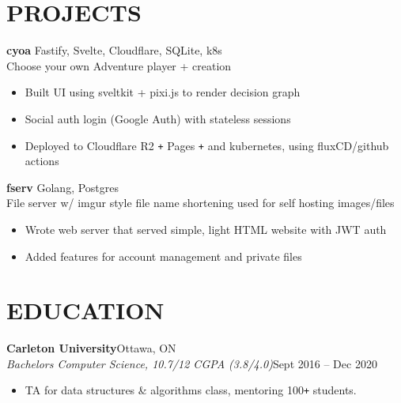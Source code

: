 \documentclass[letterpaper]{article}
\newcommand{\NewPart}[1]{\section*{\large\uppercase{\textbf{#1}}}}
\newcommand{\JobEntry}[3]{
	\normalsize\textbf{#1}\hfill\normalsize{#2}\\
	#3\vspace{0.1cm}
}
\newcommand{\DatedEntry}[3]{
	\small\textit{#1}\hfill\small{#2}\\
	\vspace{0.1cm}#3\vspace{0.1cm}
}
\newcommand{\ProjectEntry}[4]{\textbf{#1}
	\hfill \small{#2}\\
	#3\\\vspace{0.1cm}
	#4\vspace{0.1cm}
}
\begin{document}
\NewPart{Projects}
\ProjectEntry{cyoa}
{Fastify, Svelte, Cloudflare, SQLite, k8s}
{Choose your own Adventure player + creation}
{\begin{itemize}
	\item Built UI using sveltkit + pixi.js to render decision graph
	\item Social auth login (Google Auth) with stateless sessions
	\item Deployed to Cloudflare R2 \texttt{+} Pages \texttt{+} and kubernetes, using fluxCD/github actions
\end{itemize}}
\ProjectEntry{fserv}
{Golang, Postgres}
{File server w/ imgur style file name shortening used for self hosting images/files}
{\begin{itemize}
	\item Wrote web server that served simple, light HTML website with JWT auth
	\item Added features for account management and private files
\end{itemize}}\vspace{-0.3cm}

\NewPart{Education}
\JobEntry {Carleton University} {Ottawa, ON}
{\DatedEntry
{Bachelors Computer Science, 10.7/12 CGPA (3.8/4.0)}
{Sept 2016 -- Dec 2020}
{\begin{itemize}
	\item TA for data structures \& algorithms class, mentoring 100\texttt{+} students.
\end{itemize}}
}
\end{document}
